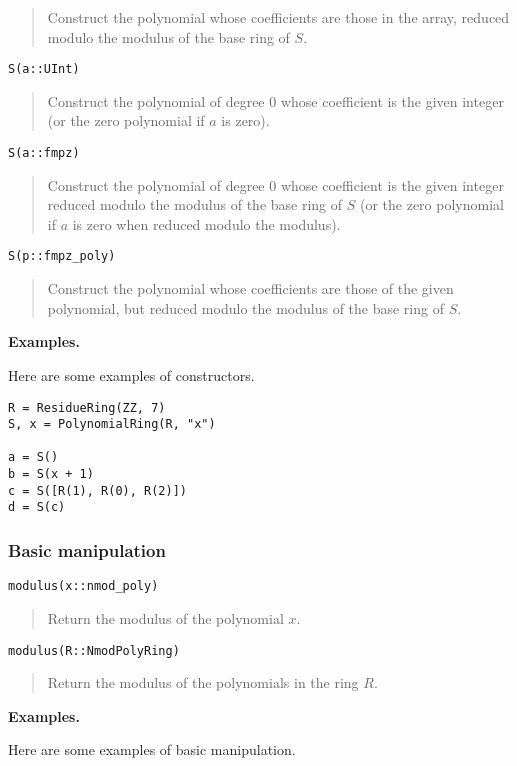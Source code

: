 \documentclass[a4paper,10pt]{article}
\newcommand{\desc}[1]{\vspace{-3mm}\begin{quote}#1\end{quote}}
\begin{document}
{{\desc{Construct the polynomial whose coefficients are those in the array, reduced modulo the
modulus of the base ring of $S$.}

\begin{lstlisting}
S(a::UInt)
\end{lstlisting}

\desc{Construct the polynomial of degree $0$ whose coefficient is the given integer (or the
zero polynomial if $a$ is zero).}

\begin{lstlisting}
S(a::fmpz)
\end{lstlisting}

\desc{Construct the polynomial of degree $0$ whose coefficient is the given integer reduced
modulo the modulus of the base ring of $S$ (or the zero polynomial if $a$ is zero when
reduced modulo the modulus).}

\begin{lstlisting}
S(p::fmpz_poly)
\end{lstlisting}

\desc{Construct the polynomial whose coefficients are those of the given polynomial, but
reduced modulo the modulus of the base ring of $S$.}

\textbf{Examples.}

Here are some examples of constructors.

\begin{lstlisting}
R = ResidueRing(ZZ, 7)
S, x = PolynomialRing(R, "x")

a = S()
b = S(x + 1)
c = S([R(1), R(0), R(2)])
d = S(c)
\end{lstlisting}

\subsubsection{Basic manipulation}

\begin{lstlisting}
modulus(x::nmod_poly)
\end{lstlisting}

\desc{Return the modulus of the polynomial $x$.}

\begin{lstlisting}
modulus(R::NmodPolyRing)
\end{lstlisting}

\desc{Return the modulus of the polynomials in the ring $R$.}

\textbf{Examples.}

Here are some examples of basic manipulation.

}}
\end{document}
